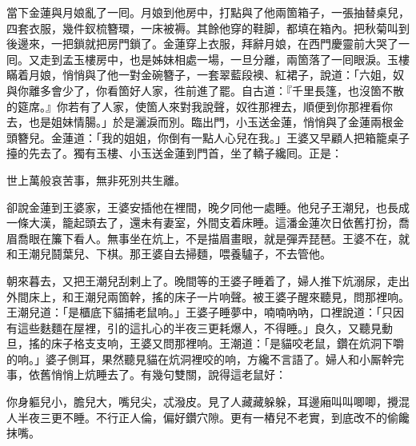當下金蓮與月娘亂了一囘。月娘到他房中，打點與了他兩箇箱子，一張抽替桌兒，四套衣服，幾件釵梳簪環，一床被褥。其餘他穿的鞋脚，都填在箱內。把秋菊叫到後邊來，一把鎖就把房門鎖了。{}金蓮穿上衣服，拜辭月娘，在西門慶靈前大哭了一囘。{}又走到孟玉樓房中，也是姊妹相處一場，一旦分離，兩箇落了一囘眼淚。玉樓瞞着月娘，悄悄與了他一對金碗簪子，一套翠藍段襖、紅裙子，說道：「六姐，奴與你離多會少了，你看箇好人家，徃前進了罷。自古道：『千里長篷，也沒箇不散的筵席。』你若有了人家，使箇人來對我說聲，奴徃那裡去，順便到你那裡看你去，也是姐妹情腸。」{}於是灑淚而別。臨出門，小玉送金蓮，悄悄與了金蓮兩根金頭簪兒。金蓮道：「我的姐姐，你倒有一點人心兒在我。」王婆又早顧人把箱籠桌子擡的先去了。獨有玉樓、小玉送金蓮到門首，坐了轎子纔囘。正是：

\begin{myquote}
世上萬般哀苦事，無非死別共生離。
\end{myquote}

卻說金蓮到王婆家，王婆安插他在裡間，晚夕同他一處睡。他兒子王潮兒，也長成一條大漢，籠起頭去了，還未有妻室，外間支着床睡。這潘金蓮次日依舊打扮，喬眉喬眼在簾下看人。無事坐在炕上，不是描眉畫眼，就是彈弄琵琶。王婆不在，就和王潮兒鬪葉兒、下棋。那王婆自去掃麵，喂養驢子，不去管他。

朝來暮去，又把王潮兒刮剌上了。晚間等的王婆子睡着了，婦人推下炕溺尿，走出外間床上，和王潮兒兩箇幹，搖的床子一片响聲。{}被王婆子醒來聽見，問那裡响。王潮兒道：「是櫃底下貓捕老鼠响。」王婆子睡夢中，喃喃吶吶，口裡說道：「只因有這些麩麵在屋裡，引的這扎心的半夜三更耗爆人，不得睡。」良久，又聽見動旦，搖的床子格支支响，王婆又問那裡响。王潮道：「是貓咬老鼠，鑽在炕洞下嚼的响。」{}婆子側耳，果然聽見貓在炕洞裡咬的响，方纔不言語了。婦人和小厮幹完事，依舊悄悄上炕睡去了。有幾句雙關，說得這老鼠好：

\begin{myquote}
你身軀兒小，膽兒大，嘴兒尖，忒潑皮。見了人藏藏躲躲，耳邊廂叫叫唧唧，攪混人半夜三更不睡。不行正人倫，偏好鑽穴隙。更有一樁兒不老實，到底改不的偷饞抹嘴。
\end{myquote}

